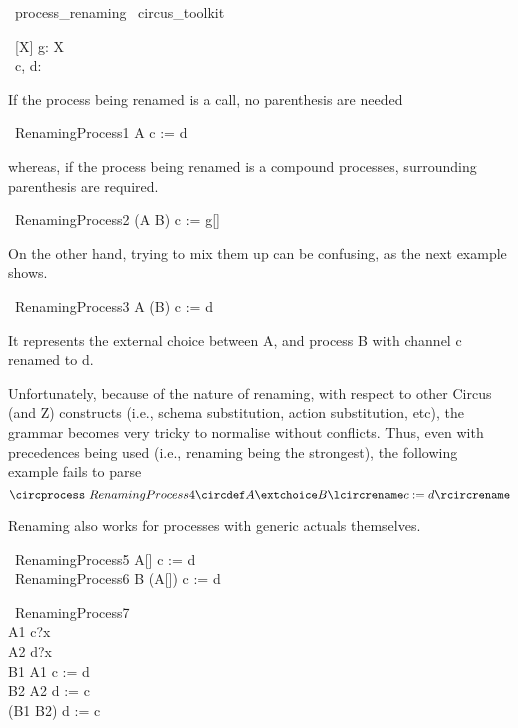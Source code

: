 \begin{zsection}
  \SECTION\ process\_renaming \parents\ circus\_toolkit
\end{zsection}

\begin{circus}
   \circchannel\ [X] g: X \cross \nat \\
   \circchannel\ c, d: \nat \cross \nat
\end{circus}

If the process being renamed is a call, no parenthesis are needed
%
\begin{circus}
   \circprocess\ RenamingProcess1 \circdef A \lcircrename c := d \rcircrename
\end{circus}
%
whereas, if the process being renamed is a compound processes,
surrounding parenthesis are required.
%
\begin{circus}
   \circprocess\ RenamingProcess2 \circdef (A \extchoice B) \lcircrename c := g[\nat] \rcircrename
\end{circus}
%
On the other hand, trying to mix them up can be confusing, as the next example shows.
%
\begin{circus}
     \circprocess\ RenamingProcess3 \circdef A \extchoice (B) \lcircrename c := d \rcircrename
\end{circus}
%
It represents the external choice between A, and process B with channel c renamed to d.

Unfortunately, because of the nature of renaming, with respect to other Circus (and Z)
constructs (i.e., schema substitution, action substitution, etc), the grammar becomes
very tricky to normalise without conflicts. Thus, even with precedences being used
(i.e., renaming being the strongest), the following example fails to parse
%
\[
     \circprocess\ RenamingProcess4 \circdef A \extchoice B \lcircrename c := d \rcircrename
\]

Renaming also works for processes with generic actuals themselves.
%
\begin{circus}
     \circprocess\ RenamingProcess5 \circdef A[\nat] \lcircrename c := d \rcircrename \\
     \circprocess\ RenamingProcess6 \circdef B \extchoice (A[\nat]) \lcircrename c := d \rcircrename
\end{circus}


\begin{circus}
     \circprocess\ RenamingProcess7 \circdef \circbegin \\
        A1 \circdef c?x \then \Skip \\
        A2 \circdef d?x \then \Skip \\
        B1 \circdef A1 \lcircrename c := d \rcircrename \\
        B2 \circdef A2 \lcircrename d := c \rcircrename \\
        \circspot (B1 \intchoice B2) \lcircrename d := c \rcircrename \\
     \circend
\end{circus}     

